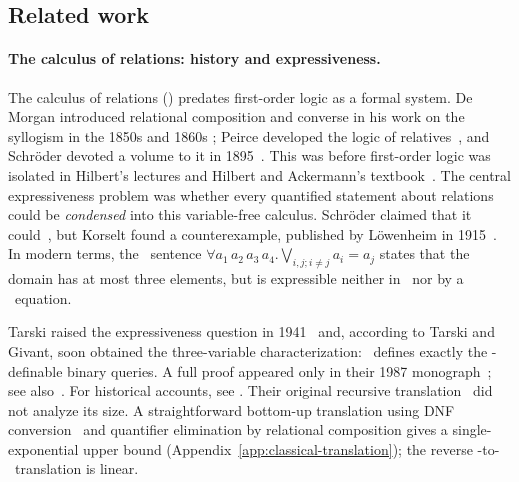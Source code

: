 \subsection{Related work}\label{sec:relwork}

\paragraph{The calculus of relations: history and expressiveness.}
The calculus of relations (\CoR) predates first-order logic as a formal
system. De Morgan introduced relational composition and converse in his
work on the syllogism in the 1850s and 1860s
\citep{demorgan1856,demorgan1864}; Peirce developed the logic of
relatives~\citep{peirce1870,peirce1880}, and Schr\"oder devoted a volume
to it in 1895~\citep{schroeder1895}. This was before first-order logic
was isolated in Hilbert's lectures and Hilbert and Ackermann's
textbook~\citep{hilbert-lectures,hilbert-ackermann1928,moore1988}.
The central expressiveness problem was whether every quantified statement
about relations could be \emph{condensed} into this variable-free calculus.
Schr\"oder claimed that it could~\citep[p.~551]{schroeder1895}, but
Korselt found a counterexample, published by L\"owenheim in
1915~\citep{loewenheim1915,loewenheim1967}. In modern terms, the \FOfour\ sentence
$
\forall a_1\,a_2\,a_3\,a_4.\bigvee_{i,j; i\neq j} a_i = a_j
$
states that the domain has at most three elements, but is expressible
neither in \FOthree\ nor by a \CoR\ equation.

Tarski raised the expressiveness question in 1941~\citep{tarski1941}
and, according to Tarski and Givant, soon obtained the three-variable
characterization: \CoR\ defines exactly the \FOthree-definable binary
queries. A full proof appeared only in their 1987
monograph~\citep{tarski-givant1987}; see
also~\citep{maddux2006}. For historical accounts, see
\citep{pratt1992,maddux1991,burris-legris,brady2000}.
Their original recursive translation~\citep[\S3.9]{tarski-givant1987}
did not analyze its size. A straightforward bottom-up translation using
DNF conversion~\citep{hilbert-ackermann1928,kleene1952,schoening1989}
and quantifier elimination by relational composition gives a
single-exponential upper bound (Appendix~\ref{app:classical-translation});
the reverse \CoR-to-\FOthree\ translation is linear.

